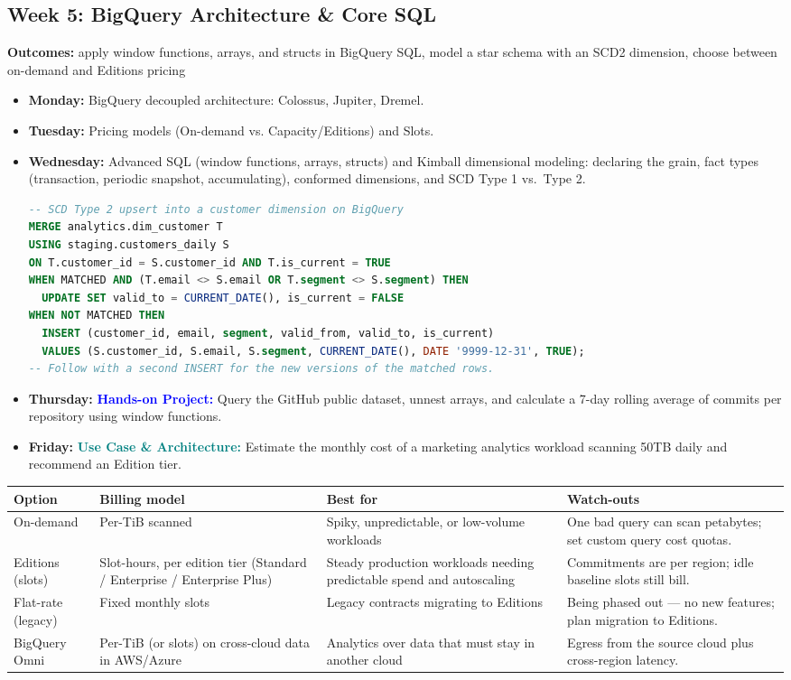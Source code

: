 \documentclass[11pt, a4paper]{article}
\newcommand{\project}[1]{\vspace{1mm}\noindent\textbf{\textcolor{blue}{Hands-on Project:}} #1}
\newcommand{\usecase}[1]{\vspace{1mm}\noindent\textbf{\textcolor{teal}{Use Case \& Architecture:}} #1}
\newcommand{\dayitem}[2]{\item \textbf{#1:} #2}
\begin{document}
\subsection*{Week 5: BigQuery Architecture \& Core SQL}
\par\noindent\textbf{Outcomes:} apply window functions, arrays, and structs in BigQuery SQL, model a star schema with an SCD2 dimension, choose between on-demand and Editions pricing
\begin{itemize}[label=-]
    \dayitem{Monday}{BigQuery decoupled architecture: Colossus, Jupiter, Dremel.}
    \dayitem{Tuesday}{Pricing models (On-demand vs. Capacity/Editions) and Slots.}
    \dayitem{Wednesday}{Advanced SQL (window functions, arrays, structs) and Kimball dimensional modeling: declaring the grain, fact types (transaction, periodic snapshot, accumulating), conformed dimensions, and SCD Type 1 vs.\ Type 2.}
\begin{lstlisting}[language=SQL]
-- SCD Type 2 upsert into a customer dimension on BigQuery
MERGE analytics.dim_customer T
USING staging.customers_daily S
ON T.customer_id = S.customer_id AND T.is_current = TRUE
WHEN MATCHED AND (T.email <> S.email OR T.segment <> S.segment) THEN
  UPDATE SET valid_to = CURRENT_DATE(), is_current = FALSE
WHEN NOT MATCHED THEN
  INSERT (customer_id, email, segment, valid_from, valid_to, is_current)
  VALUES (S.customer_id, S.email, S.segment, CURRENT_DATE(), DATE '9999-12-31', TRUE);
-- Follow with a second INSERT for the new versions of the matched rows.
\end{lstlisting}
    \dayitem{Thursday}{\project{Query the GitHub public dataset, unnest arrays, and calculate a 7-day rolling average of commits per repository using window functions.}}
    \dayitem{Friday}{\usecase{Estimate the monthly cost of a marketing analytics workload scanning 50TB daily and recommend an Edition tier.}}
\end{itemize}

\begin{center}
\renewcommand{\arraystretch}{1.4}
\begin{tabular}{@{} l l p{4.5cm} p{4.5cm} @{}}
\toprule
\textbf{Option} & \textbf{Billing model} & \textbf{Best for} & \textbf{Watch-outs} \\
\midrule
On-demand & Per-TiB scanned & Spiky, unpredictable, or low-volume workloads & One bad query can scan petabytes; set custom query cost quotas. \\
Editions (slots) & Slot-hours, per edition tier (Standard / Enterprise / Enterprise Plus) & Steady production workloads needing predictable spend and autoscaling & Commitments are per region; idle baseline slots still bill. \\
Flat-rate (legacy) & Fixed monthly slots & Legacy contracts migrating to Editions & Being phased out --- no new features; plan migration to Editions. \\
BigQuery Omni & Per-TiB (or slots) on cross-cloud data in AWS/Azure & Analytics over data that must stay in another cloud & Egress from the source cloud plus cross-region latency. \\
\bottomrule
\end{tabular}
\end{center}
\end{document}
